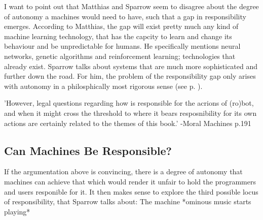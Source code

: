 \documentclass{article}
\begin{document}
I want to point out that Matthias and Sparrow seem to disagree about the degree of
autonomy a machines would need to have, such that a gap in responsibility
emerges. According to Matthias, the gap will exist pretty much any kind of
machine learning technology, that has the capcity to learn and change its
behaviour and be unpredictable for humans. He specifically mentions neural
networks, genetic algorithms and reinforcement learning; technologies that
already exist. Sparrow talks about systems that are much more sophisticated and
further down the road. For him, the problem of the responsibility gap only
arises with  autonomy in a philosphically most rigorous sense (see p.
\pageref{sparrow_autonomy}).

'However, legal questions regarding how is responsible for the acrions of
(ro)bot, and when it might cross the threshold to where it bears resposnibility
for its own actions are certainly related to the themes of this book.' -Moral
Machines p.191







\subsection{Can Machines Be Responsible?}

If the argumentation above is convincing, there is a degree of autonomy that
machines can achieve that which would render it unfair to hold the programmers and users
responible for it. It then makes sense to explore the third possible locus of
responsibility, that Sparrow talks about: The machine *ominous music starts
playing*
\end{document}

